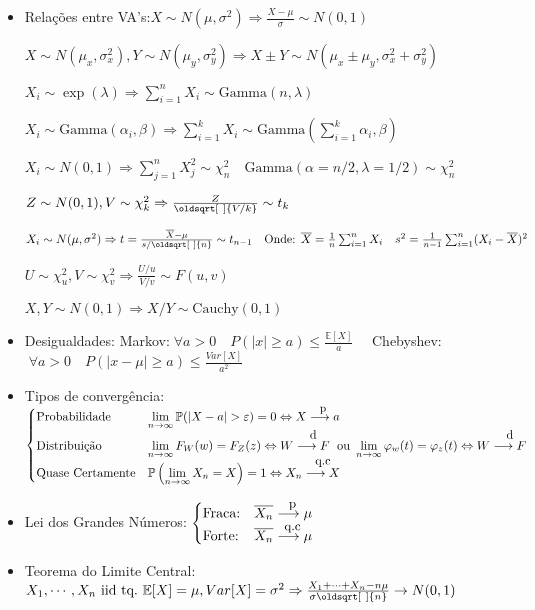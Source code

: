 \documentclass[a4paper,10pt]{article} %
\renewcommand*{\sqrt}[2][\ ]{\oldsqrt[#1]{#2}}
\begin{document}
\begin{itemize}
\item Relações entre VA's:$X \sim N(\mu,\sigma^2) \Rightarrow \frac{X-\mu}{\sigma} \sim N(0,1) $

$ X \sim N(\mu_x,\sigma_x^2),Y \sim N(\mu_y,\sigma_y^2) \Rightarrow X \pm Y \sim N(\mu_x \pm \mu_y, \sigma^2_x + \sigma^2_y)$

$X_i \sim \exp( \lambda) \Rightarrow \sum_{i=1}^n X_i  \sim \mbox{Gamma} (n,\lambda)$

$X_i \sim \mbox{Gamma}(\alpha_i,\beta) \Rightarrow \sum_{i=1}^k X_i \sim \mbox{Gamma} (\sum_{i=1}^k \alpha_i, \beta )$


$ X_i \sim N(0,1) \Rightarrow  \sum_{j=1}^n X_j^2 \sim \chi^2_n \quad \mbox{Gamma}(\alpha=n/2, \lambda=1/2) \sim \chi^2_n$

$Z \sim N(0,1), V \sim \chi^2_k \Rightarrow \frac{Z}{\sqrt{V/k}} \sim t_k $

$ X_i \sim N(\mu,\sigma^2) \Rightarrow t=\frac{\overline{X}-\mu}{s/\sqrt{n}} \sim t_{n-1} \quad \mbox{Onde: } \overline{X}=\frac{1}{n} \sum_{i=1}^n X_i \quad s^2 = \frac{1}{n-1} \sum_{i=1}^n  (X_i -\overline{X})^2$

$U \sim \chi^2_u , V \sim \chi^2_v \Rightarrow \frac{U/u}{V/v} \sim F(u,v) $

$X,Y \sim N(0,1) \Rightarrow X/Y \sim \mbox{Cauchy}(0,1)$

\item Desigualdades: Markov:$\; \forall a > 0 \quad P(|x| \geq a) \leq \frac{\mathbb{E}[X]}{a} \quad$ Chebyshev:$\; \forall a > 0 \quad P(|x - \mu| \geq a) \leq \frac{Var[X]}{a^2}$

\item Tipos de convergência:$\begin{cases}
\mbox{Probabilidade} & \displaystyle\lim_{n \to \infty} \mathbb{P}(|X-a| > \varepsilon ) = 0 \Leftrightarrow X \stackrel{\mbox{\small p }}{ \longrightarrow a} \\
\mbox{Distribuição} & \displaystyle\lim_{n \to \infty} F_W (w) = F_Z (z) \Leftrightarrow W \stackrel{\mbox{ d }}{ \longrightarrow F} \mbox{~ou~} \displaystyle\lim_{n \to \infty} \varphi_w(t)=\varphi_z(t) \Leftrightarrow W \stackrel{\mbox{ d }}{ \longrightarrow F}\\
\mbox{Quase Certamente} & \mathbb{P} \left( \displaystyle\lim_{n \to \infty} X_n = X\right) = 1 \Leftrightarrow X_n \stackrel{\mbox{ q.c }}{ \longrightarrow X}\\
\end{cases}$

\item Lei dos Grandes Números: $\begin{cases}
\mbox{Fraca:} & \overline{X_n} \stackrel{\mbox{\small p }}{ \longrightarrow \mu} \\
\mbox{Forte:} & \overline{X_n} \stackrel{\mbox{\small q.c }}{ \longrightarrow \mu}
\end{cases}$

\item Teorema do Limite Central:$X_1,\cdots,X_n \mbox{~iid tq.~} \mathbb{E}[X] = \mu,Var[X] = \sigma^2 \Rightarrow \frac{X_1+\cdots+X_n - n\mu}{\sigma\sqrt{n}} \rightarrow N(0,1)$

\end{itemize}
\end{document}
